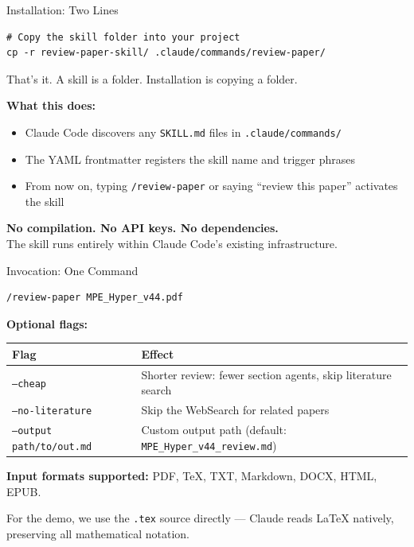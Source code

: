 \documentclass[10pt,english,aspectratio=169]{beamer}
\begin{document}
\begin{frame}[fragile]{Installation: Two Lines}

\begin{lstlisting}[style=bashstyle]
# Copy the skill folder into your project
cp -r review-paper-skill/ .claude/commands/review-paper/
\end{lstlisting}

\vspace{0.3cm}
That's it. A skill is a folder. Installation is copying a folder.

\vspace{0.3cm}
\textbf{What this does:}
\begin{itemize}
    \item Claude Code discovers any \texttt{SKILL.md} files in \texttt{.claude/commands/}
    \item The YAML frontmatter registers the skill name and trigger phrases
    \item From now on, typing \texttt{/review-paper} or saying ``review this paper'' activates the skill
\end{itemize}

\vspace{0.3cm}
\textbf{No compilation. No API keys. No dependencies.}\\
The skill runs entirely within Claude Code's existing infrastructure.

\end{frame}

\begin{frame}[fragile]{Invocation: One Command}

\begin{lstlisting}[style=bashstyle]
/review-paper MPE_Hyper_v44.pdf
\end{lstlisting}

\vspace{0.3cm}
\textbf{Optional flags:}
\begin{small}
\begin{tabular}{lp{9cm}}
\toprule
\textbf{Flag} & \textbf{Effect} \\
\midrule
\texttt{--cheap} & Shorter review: fewer section agents, skip literature search \\
\texttt{--no-literature} & Skip the WebSearch for related papers \\
\texttt{--output path/to/out.md} & Custom output path (default: \texttt{MPE\_Hyper\_v44\_review.md}) \\
\bottomrule
\end{tabular}
\end{small}

\vspace{0.3cm}
\textbf{Input formats supported:} PDF, TeX, TXT, Markdown, DOCX, HTML, EPUB.

\vspace{0.2cm}
For the demo, we use the \texttt{.tex} source directly --- Claude reads \LaTeX{} natively, preserving all mathematical notation.

\end{frame}
\end{document}
